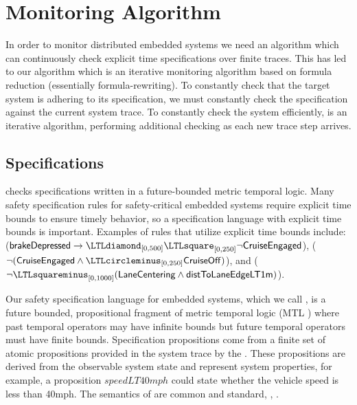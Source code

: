 
\section{Monitoring Algorithm}

In order to monitor distributed embedded systems we need an algorithm which can continuously check explicit time specifications over finite traces. This has led to our algorithm \monitor which is an iterative monitoring algorithm based on formula reduction (essentially formula-rewriting). 
%
To constantly check that the target system is adhering to its specification, we must constantly check the specification against the current system trace. To constantly check the system efficiently, \monitor is an iterative algorithm, performing additional checking as each new trace step arrives.

\subsection{Specifications}
\monitor checks specifications written in a future-bounded metric temporal logic. Many safety specification rules for safety-critical embedded systems require explicit time bounds to ensure timely behavior, so a specification language with explicit time bounds is important. 
Examples of rules that utilize explicit time bounds include: %
 ($\pred{brakeDepressed} \rightarrow \eventually_{[0, 500]} \henceforth_{[0,250]} \neg \pred{CruiseEngaged}$), 
 ($\neg (\pred{CruiseEngaged} \wedge \yesterday_{[0,250]} \pred{CruiseOff})$), 
and  ($\neg \historically_{[0, 1000]}(\pred{LaneCentering} \wedge \pred{distToLaneEdgeLT1m})$).

Our safety specification language for embedded systems, which we call \planguage, is a future bounded, propositional fragment of metric temporal logic (MTL \cite{Koymans1990}) where past temporal operators may have infinite bounds but future temporal operators must have finite bounds. 
Specification propositions come from a finite set of atomic propositions provided in the system trace by the \sfmap. 
These propositions are derived from the observable system state and represent system properties, for example, a proposition $speedLT40mph$ could state whether the vehicle speed is less than 40mph.
%
The semantics of \planguage are common and standard, \eg, \cite{Basin2008}.

